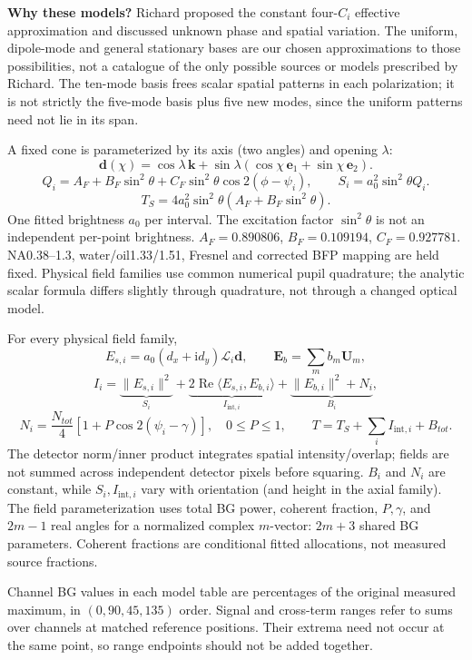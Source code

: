 \documentclass[10pt,a4paper]{article}
\begin{document}
\textbf{Why these models?} Richard proposed the constant four-$C_i$ effective approximation and discussed unknown phase and spatial variation. The uniform, dipole-mode and general stationary bases are our chosen approximations to those possibilities, not a catalogue of the only possible sources or models prescribed by Richard. The ten-mode basis frees scalar spatial patterns in each polarization; it is not strictly the five-mode basis plus five new modes, since the uniform patterns need not lie in its span.
\newpage

A fixed cone is parameterized by its axis (two angles) and opening $\lambda$:
\[
\mathbf d(\chi)=\cos\lambda\,\mathbf k+\sin\lambda(\cos\chi\,\mathbf e_1+\sin\chi\,\mathbf e_2).
\]
\[
Q_i=A_F+B_F\sin^2\theta+C_F\sin^2\theta\cos2(\phi-\psi_i),
\qquad S_i=a_0^2\sin^2\theta Q_i.
\]
\[
T_S=4a_0^2\sin^2\theta(A_F+B_F\sin^2\theta).
\]
One fitted brightness $a_0$ per interval. The excitation factor $\sin^2\theta$ is not an independent per-point brightness. $A_F=0.890806$, $B_F=0.109194$, $C_F=0.927781$. NA0.38--1.3, water/oil1.33/1.51, Fresnel and corrected BFP mapping are held fixed. Physical field families use common numerical pupil quadrature; the analytic scalar formula differs slightly through quadrature, not through a changed optical model.

For every physical field family,
\[
E_{s,i}=a_0(d_x+\mathrm i d_y)\mathcal{L}_i \mathbf d,\qquad \mathbf{E}_b=\sum_m b_m\mathbf{U}_m,
\]
\[
I_i=\underbrace{\|E_{s,i}\|^2}_{S_i}
+\underbrace{2\operatorname{Re}\langle E_{s,i},E_{b,i}\rangle}_{I_{\mathrm{int},i}}
+\underbrace{\|E_{b,i}\|^2+N_i}_{B_i},
\]
\[
N_i=\frac{N_{tot}}4[1+P\cos2(\psi_i-\gamma)],\quad0\leq P\leq1,
\qquad T=T_S+\sum_iI_{\mathrm{int},i}+B_{tot}.
\]
The detector norm/inner product integrates spatial intensity/overlap; fields are not summed across independent detector pixels before squaring. $B_i$ and $N_i$ are constant, while $S_i,I_{\mathrm{int},i}$ vary with orientation (and height in the axial family). The field parameterization uses total BG power, coherent fraction, $P,\gamma$, and $2m-1$ real angles for a normalized complex $m$-vector: $2m+3$ shared BG parameters. Coherent fractions are conditional fitted allocations, not measured source fractions.

Channel BG values in each model table are percentages of the original measured maximum, in $(0,90,45,135)$ order. Signal and cross-term ranges refer to sums over channels at matched reference positions. Their extrema need not occur at the same point, so range endpoints should not be added together.
\end{document}
